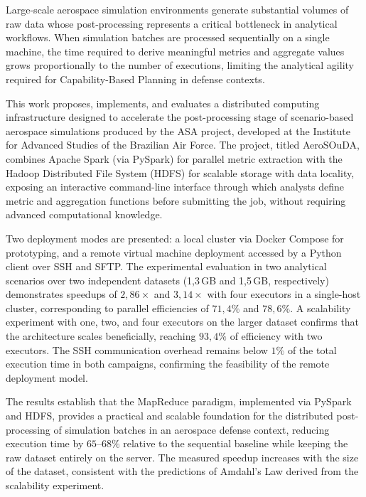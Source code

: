 Large-scale aerospace simulation environments generate substantial volumes of raw data
whose post-processing represents a critical bottleneck in analytical workflows. When
simulation batches are processed sequentially on a single machine, the time required to
derive meaningful metrics and aggregate values grows proportionally to the number of
executions, limiting the analytical agility required for Capability-Based Planning in
defense contexts.

This work proposes, implements, and evaluates a distributed computing infrastructure designed
to accelerate the post-processing stage of scenario-based aerospace simulations produced by
the ASA project, developed at the Institute for Advanced Studies of the Brazilian Air Force.
The project, titled AeroSOuDA, combines Apache Spark (via PySpark) for parallel metric
extraction with the Hadoop Distributed File System (HDFS) for scalable storage with data
locality, exposing an interactive command-line interface through which analysts define metric
and aggregation functions before submitting the job, without requiring advanced computational
knowledge.

Two deployment modes are presented: a local cluster via Docker Compose for prototyping,
and a remote virtual machine deployment accessed by a Python client over SSH and SFTP. The
experimental evaluation in two analytical scenarios over two independent datasets (1,3\,GB
and 1,5\,GB, respectively) demonstrates speedups of $2{,}86\times$ and $3{,}14\times$ with
four executors in a single-host cluster, corresponding to parallel efficiencies of
$71{,}4\%$ and $78{,}6\%$. A scalability experiment with one, two, and four executors on
the larger dataset confirms that the architecture scales beneficially, reaching $93{,}4\%$
of efficiency with two executors. The SSH communication overhead remains below $1\%$ of the
total execution time in both campaigns, confirming the feasibility of the remote deployment
model.

The results establish that the MapReduce paradigm, implemented via PySpark and HDFS,
provides a practical and scalable foundation for the distributed post-processing of
simulation batches in an aerospace defense context, reducing execution time by $65$--$68\%$
relative to the sequential baseline while keeping the raw dataset entirely on the server.
The measured speedup increases with the size of the dataset, consistent with the predictions
of Amdahl's Law derived from the scalability experiment.